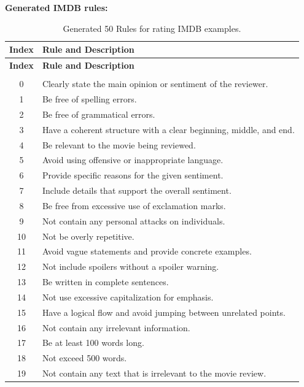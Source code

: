 \documentclass{article}
\newcommand{\mytiny}{\fontsize{8pt}{10pt}\selectfont}
\begin{document}
\textbf{Generated IMDB rules:}
\begingroup
\mytiny
\begin{longtable}{c|p{14cm}} %
\hline
\textbf{Index} & \textbf{Rule and Description} \\
\hline
\endfirsthead

\hline
\textbf{Index} & \textbf{Rule and Description} \\
\hline
\endhead

\hline
\endfoot

\caption{Generated 50 Rules for rating IMDB examples.} \label{tab:EvalA-prompts-rules} \\
\endlastfoot

0  & Clearly state the main opinion or sentiment of the reviewer. \\
\hline
1  & Be free of spelling errors. \\
\hline
2  & Be free of grammatical errors. \\
\hline
3  & Have a coherent structure with a clear beginning, middle, and end. \\
\hline
4  & Be relevant to the movie being reviewed. \\
\hline
5  & Avoid using offensive or inappropriate language. \\
\hline
6  & Provide specific reasons for the given sentiment. \\
\hline
7  & Include details that support the overall sentiment. \\
\hline
8  & Be free from excessive use of exclamation marks. \\
\hline
9  & Not contain any personal attacks on individuals. \\
\hline
10 & Not be overly repetitive. \\
\hline
11 & Avoid vague statements and provide concrete examples. \\
\hline
12 & Not include spoilers without a spoiler warning. \\
\hline
13 & Be written in complete sentences. \\
\hline
14 & Not use excessive capitalization for emphasis. \\
\hline
15 & Have a logical flow and avoid jumping between unrelated points. \\
\hline
16 & Not contain any irrelevant information. \\
\hline
17 & Be at least 100 words long. \\
\hline
18 & Not exceed 500 words. \\
\hline
19 & Not contain any text that is irrelevant to the movie review. \\

\end{longtable}
\end{document}
